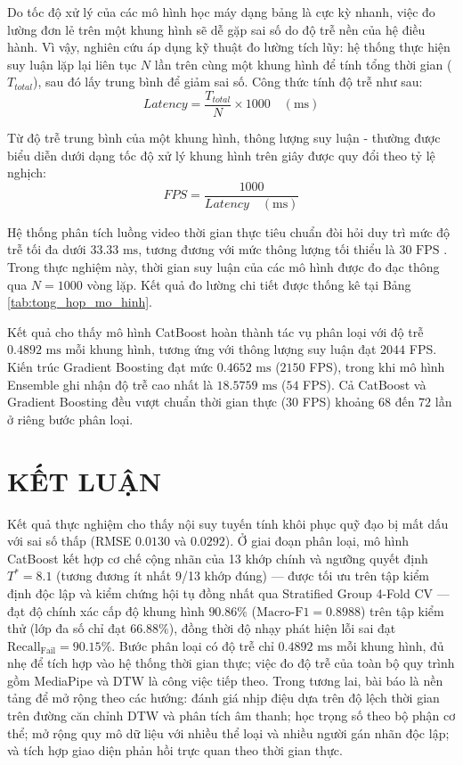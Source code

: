 \documentclass[10pt,conference,a4paper]{IEEEtran}
\begin{document}
Do tốc độ xử lý của các mô hình học máy dạng bảng là cực kỳ nhanh, việc đo lường đơn lẻ trên một khung hình sẽ dễ gặp sai số do độ trễ nền của hệ điều hành. Vì vậy, nghiên cứu áp dụng kỹ thuật đo lường tích lũy: hệ thống thực hiện suy luận lặp lại liên tục $N$ lần trên cùng một khung hình để tính tổng thời gian ($T_{total}$), sau đó lấy trung bình để giảm sai số. Công thức tính độ trễ như sau:
\begin{equation}
Latency = \frac{T_{total}}{N} \times 1000 \quad (\text{ms})
\end{equation}

Từ độ trễ trung bình của một khung hình, thông lượng suy luận - thường được biểu diễn dưới dạng tốc độ xử lý khung hình trên giây được quy đổi theo tỷ lệ nghịch:
\begin{equation}
FPS = \frac{1000}{Latency \quad (\text{ms})}
\end{equation}

Hệ thống phân tích luồng video thời gian thực tiêu chuẩn đòi hỏi duy trì mức độ trễ tối đa dưới $33.33 \text{ ms}$, tương đương với mức thông lượng tối thiểu là $30 \text{ FPS}$ \cite{ali2022}. Trong thực nghiệm này, thời gian suy luận của các mô hình được đo đạc thông qua $N = 1000$ vòng lặp. Kết quả đo lường chi tiết được thống kê tại Bảng \ref{tab:tong_hop_mo_hinh}.

Kết quả cho thấy mô hình CatBoost hoàn thành tác vụ phân loại với độ trễ $0.4892 \text{ ms}$ mỗi khung hình, tương ứng với thông lượng suy luận đạt $2044$ FPS. Kiến trúc Gradient Boosting đạt mức $0.4652 \text{ ms}$ ($2150$ FPS), trong khi mô hình Ensemble ghi nhận độ trễ cao nhất là $18.5759 \text{ ms}$ ($54$ FPS). Cả CatBoost và Gradient Boosting đều vượt chuẩn thời gian thực (30 FPS) khoảng $68$ đến $72$ lần ở riêng bước phân loại.

\section{KẾT LUẬN}
\label{Sec:KetLuan}
Kết quả thực nghiệm cho thấy nội suy tuyến tính khôi phục quỹ đạo bị mất dấu với sai số thấp (RMSE $0.0130$ và $0.0292$). Ở giai đoạn phân loại, mô hình CatBoost kết hợp cơ chế cộng nhãn của 13 khớp chính và ngưỡng quyết định $T^* = 8.1$ (tương đương ít nhất 9/13 khớp đúng) — được tối ưu trên tập kiểm định độc lập và kiểm chứng hội tụ đồng nhất qua Stratified Group 4-Fold CV — đạt độ chính xác cấp độ khung hình $90.86\%$ ($\text{Macro-F1} = 0.8988$) trên tập kiểm thử (lớp đa số chỉ đạt $66.88\%$), đồng thời độ nhạy phát hiện lỗi sai đạt $\text{Recall}_{\text{Fail}} = 90.15\%$. Bước phân loại có độ trễ chỉ $0.4892\text{ ms}$ mỗi khung hình, đủ nhẹ để tích hợp vào hệ thống thời gian thực; việc đo độ trễ của toàn bộ quy trình gồm MediaPipe và DTW là công việc tiếp theo. Trong tương lai, bài báo là nền tảng để mở rộng theo các hướng: đánh giá nhịp điệu dựa trên độ lệch thời gian trên đường căn chỉnh DTW và phân tích âm thanh; học trọng số theo bộ phận cơ thể; mở rộng quy mô dữ liệu với nhiều thể loại và nhiều người gán nhãn độc lập; và tích hợp giao diện phản hồi trực quan theo thời gian thực.
\balance



\end{document}
